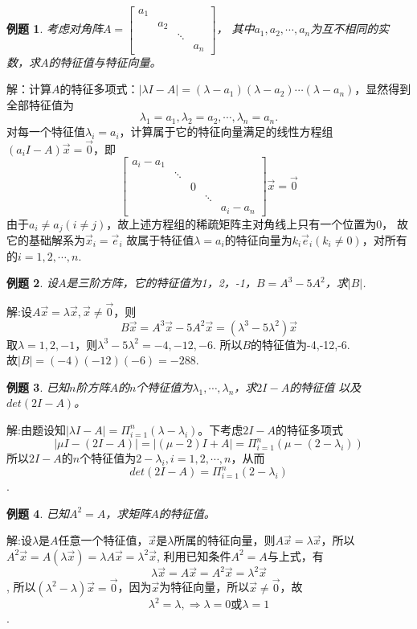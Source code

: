 \documentclass[a4paper]{book}
\newtheorem{eg}{例题}[chapter]
\begin{document}
\begin{eg}
考虑对角阵$A=\begin{bmatrix}a_1&&&\\&a_2&&\\&&\ddots&\\&&&a_n\end{bmatrix}$，
其中$a_1,a_2,\cdots,a_n$为互不相同的实数，求$A$的特征值与特征向量。
\end{eg}
解：计算$A$的特征多项式：$|\lambda I-A|=(\lambda-a_1)(\lambda-a_2)\cdots(\lambda-a_n)$，显然得到全部特征值为
\begin{equation*}
\lambda_1=a_1,\lambda_2=a_2,\cdots,\lambda_n=a_n.
\end{equation*}
对每一个特征值$\lambda_i=a_i$，计算属于它的特征向量满足的线性方程组
$(a_iI-A)\vec{x}=\vec{0}$，即
\begin{equation*}
\begin{bmatrix}
a_i-a_1&&&&\\
&\ddots&&&\\
&&0&&\\
&&&\ddots&\\
&&&&a_i-a_n
\end{bmatrix}
\vec{x}=\vec{0}
\end{equation*}
由于$a_i\neq a_j(i\neq j)$，故上述方程组的稀疏矩阵主对角线上只有一个位置为0，
故它的基础解系为$\vec{x}_i=\vec{e}_i$
故属于特征值$\lambda=a_i$的特征向量为$k_i\vec{e}_i(k_i\neq 0)$，对所有的$i=1,2,\cdots,n$.


\begin{eg}
设$A$是三阶方阵，它的特征值为1，2，-1，$B=A^3-5A^2$，求$|B|$.
\end{eg}
解:设$A\vec{x}=\lambda\vec{x},\vec{x}\neq\vec{0}$，则$$B\vec{x}=A^3\vec{x}-5A^2\vec{x}=(\lambda^3-5\lambda^2)\vec{x}$$
取$\lambda=1,2,-1$，则$\lambda^3-5\lambda^2=-4,-12,-6$.
所以$B$的特征值为-4,-12,-6.\\
故$|B|=(-4)(-12)(-6)=-288$.

\begin{eg}
已知$n$阶方阵$A$的$n$个特征值为$\lambda_1,\cdots,\lambda_n$，求$2I-A$的特征值
以及$det(2I-A)$。
\end{eg}
解:由题设知$|\lambda I-A|=\Pi_{i=1}^n(\lambda-\lambda_i)$。下考虑$2I-A$的特征多项式
\begin{equation*}
|\mu I-(2I-A)|=|(\mu -2)I + A|=\Pi_{i=1}^n(\mu-(2-\lambda_i))
\end{equation*}
所以$2I-A$的$n$个特征值为$2-\lambda_i,i=1,2,\cdots,n$，从而
$$det(2I-A)=\Pi_{i=1}^n(2-\lambda_i)$$.

\begin{eg}
已知$A^2=A$，求矩阵$A$的特征值。
\end{eg}
解:设$\lambda$是$A$任意一个特征值，$\vec{x}$是$\lambda$所属的特征向量，则$A\vec{x}=\lambda\vec{x}$，所以$A^2\vec{x}=A(\lambda\vec{x})=\lambda A\vec{x}=\lambda^2\vec{x}$,
利用已知条件$A^2=A$与上式，有
$$\lambda\vec{x}=A\vec{x}=A^2\vec{x}=\lambda^2\vec{x}$$,
所以$(\lambda^2-\lambda)\vec{x}=\vec{0}$，因为$\vec{x}$为特征向量，所以$\vec{x}\neq\vec{0}$，故
$$\lambda^2=\lambda,\Rightarrow\lambda =0 \text{或}\lambda=1$$.
\end{document}
